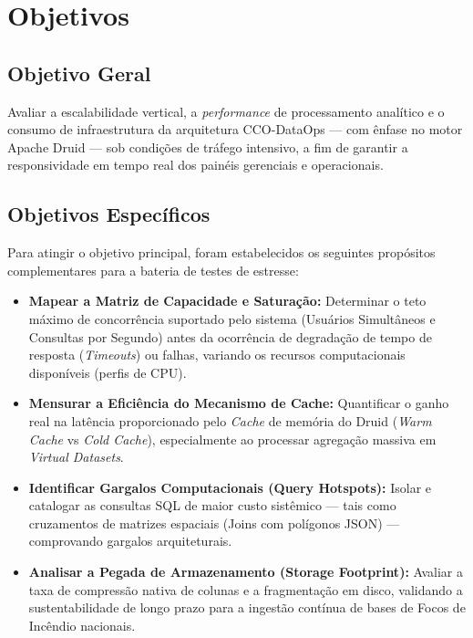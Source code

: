 \section{Objetivos}

\subsection{Objetivo Geral}
Avaliar a escalabilidade vertical, a \textit{performance} de processamento analítico e o consumo de infraestrutura da arquitetura CCO-DataOps --- com ênfase no motor Apache Druid --- sob condições de tráfego intensivo, a fim de garantir a responsividade em tempo real dos painéis gerenciais e operacionais.

\subsection{Objetivos Específicos}
Para atingir o objetivo principal, foram estabelecidos os seguintes propósitos complementares para a bateria de testes de estresse:

\begin{itemize}
    \item \textbf{Mapear a Matriz de Capacidade e Saturação:} Determinar o teto máximo de concorrência suportado pelo sistema (Usuários Simultâneos e Consultas por Segundo) antes da ocorrência de degradação de tempo de resposta (\textit{Timeouts}) ou falhas, variando os recursos computacionais disponíveis (perfis de CPU).
    \item \textbf{Mensurar a Eficiência do Mecanismo de Cache:} Quantificar o ganho real na latência proporcionado pelo \textit{Cache} de memória do Druid (\textit{Warm Cache} vs \textit{Cold Cache}), especialmente ao processar agregação massiva em \textit{Virtual Datasets}.
    \item \textbf{Identificar Gargalos Computacionais (Query Hotspots):} Isolar e catalogar as consultas SQL de maior custo sistêmico --- tais como cruzamentos de matrizes espaciais (Joins com polígonos JSON) --- comprovando gargalos arquiteturais.
    \item \textbf{Analisar a Pegada de Armazenamento (Storage Footprint):} Avaliar a taxa de compressão nativa de colunas e a fragmentação em disco, validando a sustentabilidade de longo prazo para a ingestão contínua de bases de Focos de Incêndio nacionais.
\end{itemize}
